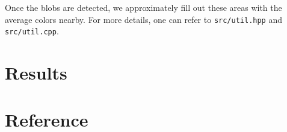 \documentclass[11pt]{article}
\begin{document}
Once the blobs are detected, we approximately fill out these areas with the average colors nearby. For more details, one can refer to \texttt{src/util.hpp} and \texttt{src/util.cpp}. 

\section{Results}

\begin{figure}[!ht]
  \centering
  \label{distort}
\end{figure}

\section{Reference}


\end{document}
